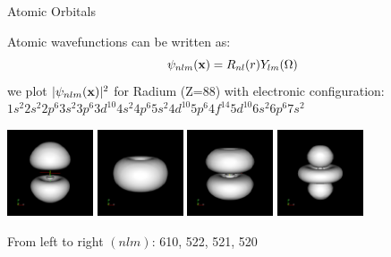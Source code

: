 \documentclass{beamer}
\begin{document}
\begin{frame}{Atomic Orbitals}

Atomic wavefunctions can be written as:
\[
    \psi_{nlm}({\bf x}) = R_{nl}(r) Y_{lm}(\Omega)
\]
we plot $| \psi_{nlm}({\bf x})|^2$ for Radium (Z=88) with electronic
configuration: $1s^2 2s^2 2p^6 3s^2 3p^6 3d^{10} 4s^2 4p^6 5s^2 4d^{10}
5p^6 4f^{14} 5d^{10} 6s^2 6p^6 7s^2$

\includegraphics[width=1in]{../img/orbital_n6l1m0.png}
\includegraphics[width=1in]{../img/orbital_n5l2m2.png}
\includegraphics[width=1in]{../img/orbital_n5l2m1.png}
\includegraphics[width=1in]{../img/orbital_n5l2m0.png}

From left to right $(n l m)$: 610, 522, 521, 520

\end{frame}
\end{document}

